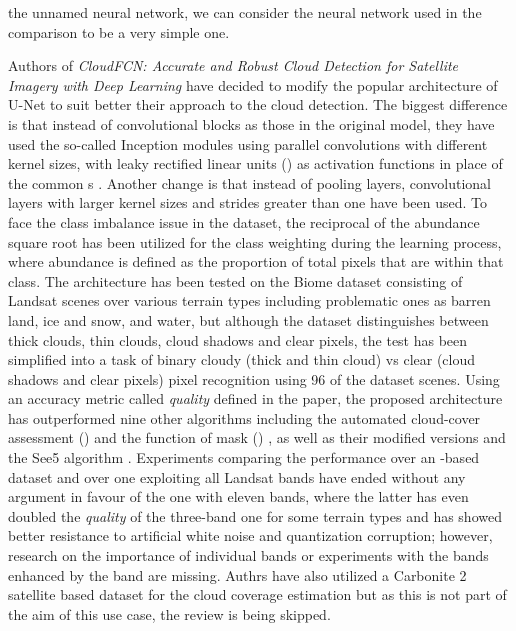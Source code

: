 the unnamed neural network, we can consider the neural network used in the comparison to be a very simple one.

Authors of \textit{CloudFCN: Accurate and Robust Cloud Detection for Satellite Imagery with Deep Learning} have decided to modify the popular architecture of U-Net \cite{u-net} to suit better their approach to the cloud detection. The biggest difference is that instead of convolutional blocks as those in the original model, they have used the so-called Inception modules \cite{inception} using parallel convolutions with different kernel sizes, with leaky rectified linear units () \cite{leaky-relu} as activation functions in place of the common s \cite{relu}. Another change is that instead of pooling layers, convolutional layers with larger kernel sizes and strides greater than one have been used. To face the class imbalance issue in the dataset, the reciprocal of the abundance square root has been utilized for the class weighting during the learning process, where abundance is defined as the proportion of total pixels that are within that class. The architecture has been tested on the Biome dataset \cite{biome} consisting of Landsat scenes over various terrain types including problematic ones as barren land, ice and snow, and water, but although the dataset distinguishes between thick clouds, thin clouds, cloud shadows and clear pixels, the test has been simplified into a task of binary cloudy (thick and thin cloud) vs clear (cloud shadows and clear pixels) pixel recognition using 96 of the dataset scenes. Using an accuracy metric called \textit{quality} defined in the paper, the proposed architecture has outperformed nine other algorithms including the automated cloud-cover assessment () \cite{acca} and the function of mask () \cite{fmask}, as well as their modified versions and the See5 algorithm \cite{biome}. Experiments comparing the performance over an -based dataset and over one exploiting all Landsat bands have ended without any argument in favour of the one with eleven bands, where the latter has even doubled the \textit{quality} of the three-band one for some terrain types and has showed better resistance to artificial white noise and quantization corruption; however, research on the importance of individual bands or experiments with the  bands enhanced by the  band are missing. Authrs have also utilized a Carbonite 2 satellite based dataset for the cloud coverage estimation but as this is not part of the aim of this use case, the review is being skipped.

